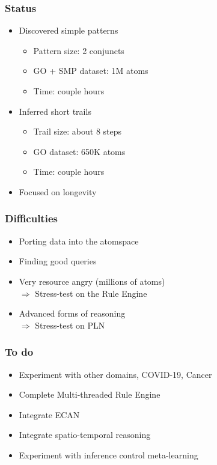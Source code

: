 \documentclass[aspectratio=169]{beamer}
\begin{document}
\begin{frame}
  \frametitle{Status}

  \begin{itemize}
  \item Discovered simple patterns
    \begin{itemize}
    \item Pattern size: 2 conjuncts
    \item GO + SMP dataset: 1M atoms
    \item Time: couple hours
    \end{itemize}
  \item Inferred short trails
    \begin{itemize}
    \item Trail size: about 8 steps
    \item GO dataset: 650K atoms
    \item Time: couple hours
    \end{itemize}
  \item Focused on longevity
  \end{itemize}
\end{frame}

\begin{frame}
  \frametitle{Difficulties}

  \begin{itemize}
  \item Porting data into the atomspace
  \item Finding good queries
  \item Very resource angry (millions of atoms)\\
    $\Rightarrow$ \alert{Stress-test on the Rule Engine}
  \item Advanced forms of reasoning\\
    $\Rightarrow$ \alert{Stress-test on PLN}
  \end{itemize}
\end{frame}

\begin{frame}
  \frametitle{To do}

  \begin{itemize}
  \item Experiment with other domains, COVID-19, Cancer
  \item Complete Multi-threaded Rule Engine
  \item Integrate ECAN
  \item Integrate spatio-temporal reasoning
  \item Experiment with inference control meta-learning
  \end{itemize}
\end{frame}
\end{document}
